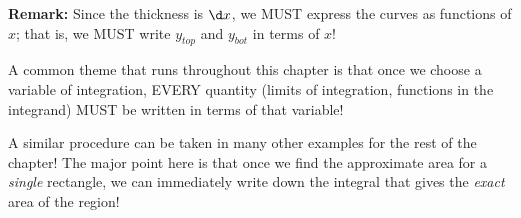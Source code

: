 \documentclass{ximera}
\begin{document}
\textbf{Remark:} Since the thickness is $\d x$, we MUST express the curves as functions of $x$; that is, we MUST write $y_{top}$ and $y_{bot}$ in terms of $x$!
 
A common theme that runs throughout this chapter is that once we choose a variable of integration, EVERY quantity (limits of integration, functions in the integrand) MUST be written in terms of that variable!


A similar procedure can be taken in many other examples for the rest of the chapter! The major point here is that once we find the approximate area for a \emph{single} rectangle, we can immediately write down the integral that gives the \emph{exact} area of the region!













\end{document}

